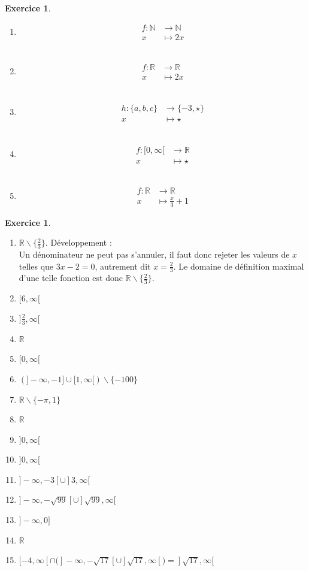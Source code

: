 \documentclass[a4paper,13pt]{scrreprt}
\theoremstyle{plain}
\theoremstyle{definition}
\newtheorem{exo}[subsection]{Exercice}
\newcommand{\nn}{\mathbb{N}}
\newcommand{\rr}{\mathbb{R}}
\begin{document}
\begin{exo} ~~\\
	\begin{enumerate}
		\item \begin{align*}
		f : \nn &\to \nn \\
		x &\mapsto 2x
		\end{align*} \\
		\item \begin{align*}
		f : \rr &\to \rr \\
		x &\mapsto 2x
		\end{align*} \\
		\item \begin{align*}
		h : \{a,b,c\} &\to \{-3,\star\} \\
		x &\mapsto \star
		\end{align*} \\
		\item \begin{align*}
		f : [0,\infty[ &\to \rr \\
		x &\mapsto \star
		\end{align*} \\
		\item \begin{align*}
		f : \rr &\to \rr \\
		x &\mapsto \frac{x}{3} + 1
		\end{align*}
	\end{enumerate}
\end{exo}

\begin{exo} ~~\\
	\begin{enumerate}
		\item $\rr \backslash \{\frac{2}{3}\}$. Développement :\\
		Un dénominateur ne peut pas s'annuler, il faut donc rejeter les valeurs de $x$ telles que ${3x-2}=0$, autrement dit $x=\frac{2}{3}$. Le domaine de définition maximal d'une telle fonction est donc $\rr \backslash \{\frac{2}{3}\}$.
		\item $[6,\infty[$
		\item $]\frac{2}{3},\infty[$
		\item $\rr$
		\item $[0,\infty[$
		\item $(]-\infty,-1] \cup [1,\infty[) \backslash \{-100\}$
		\item $\rr \backslash \{-\pi , 1\}$
		\item $\rr$
		\item $]0,\infty[$
		\item $]0,\infty[$
		\item $]-\infty,-3[ \cup ]3,\infty[$
		\item $]-\infty,-\sqrt{99}[ \cup ]\sqrt{99},\infty[$
		\item $]-\infty,0]$
		\item $\rr$
		\item $[-4,\infty[ \cap (]-\infty,-\sqrt{17}[ \cup ]\sqrt{17},\infty[) = ]\sqrt{17},\infty[$
	\end{enumerate}
\end{exo}
\end{document}
